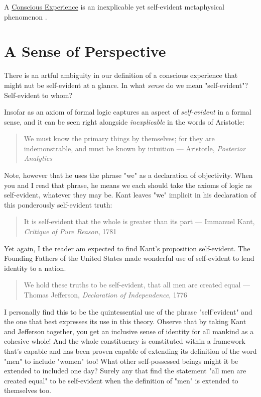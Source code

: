 \documentclass[runningheads]{llncs}
\begin{document}
\setcounter{definition}{0}
\begin{sdefinition}
	A \href{https://github.com/DNA-Platform/inexplicable-phenomena/formalism/definitions/conscious-experience.pdf}{Conscious Experience} is an inexplicable yet self-evident metaphysical phenomenon \cite{Formalism}.
\end{sdefinition}


\section{A Sense of Perspective}

There is an artful ambiguity in our definition of a conscious experience that might nut be self-evident at a glance. In what \emph{sense} do we mean "self-evident"? Self-evident to whom? 

Insofar as an axiom of formal logic captures an aspect of \emph{self-evident} in a formal sense, and it can be seen right alongside \emph{inexplicable} in the words of Aristotle:

\begin{quote}
We must know the primary things by themselves; for they are indemonstrable, and must be known by intuition --- Aristotle, \emph{Posterior Analytics}
\end{quote}

Note, however that he uses the phrase "we" as a declaration of objectivity. When you and I read that phrase, he means we each should take the axioms of logic as self-evident, whatever they may be. Kant leaves "we" implicit in his declaration of this ponderously self-evident truth:

\begin{quote}
It is self-evident that the whole is greater than its part --- Immanuel Kant, \emph{Critique of Pure Reason}, 1781
\end{quote}

Yet again, I the reader am expected to find Kant's proposition self-evident. The Founding Fathers of the United States made wonderful use of self-evident to lend identity to a nation.

\begin{quote}
We hold these truths to be self-evident, that all men are created equal --- Thomas Jefferson, \emph{Declaration of Independence}, 1776
\end{quote}

I personally find this to be the quintessential use of the phrase "self'evident" and the one that best expresses its use in this theory. Observe that by taking Kant and Jefferson together, you get an inclusive sense of identity for all mankind as a cohesive whole! And the whole constituency is constituted within a framework that's capable and has been proven capable of extending its definition of the word "men" to include "women" too! What other self-possessed beings might it be extended to included one day? Surely any that find the statement "all men are created equal" to be self-evident when the definition of "men" is extended to themselves too.  
\end{document}
